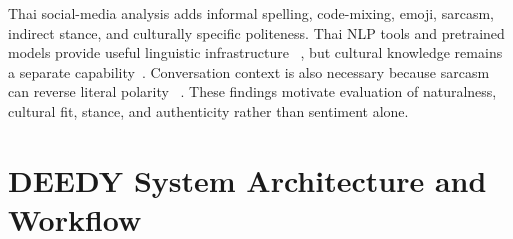 \documentclass[conference]{IEEEtran}
\begin{document}
Thai social-media analysis adds informal spelling, code-mixing, emoji,
sarcasm, indirect stance, and culturally specific politeness. Thai NLP tools
and pretrained models provide useful linguistic infrastructure
~\cite{arreerard2022survey,lowphansirikul2021wangchanberta,
pipatanakul2024typhoon2}, but cultural knowledge
remains a separate capability~\cite{kim2025thaicli}. Conversation context is
also necessary because sarcasm can reverse literal polarity
~\cite{hazarika2018cascade}. These findings motivate evaluation of naturalness,
cultural fit, stance, and authenticity rather than sentiment alone.

\section{DEEDY System Architecture and Workflow}
\end{document}
